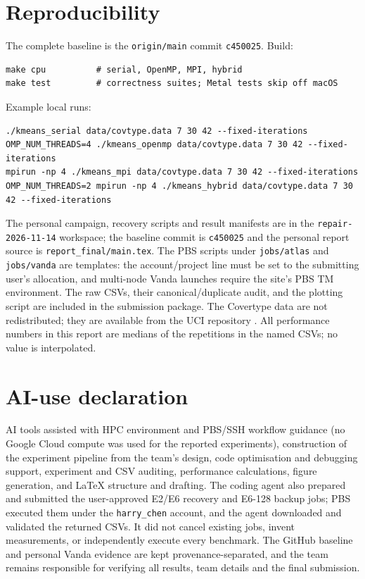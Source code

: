 \documentclass[10pt,a4paper]{article}
\newcommand{\code}[1]{\texttt{#1}}
\begin{document}
\section{Reproducibility}
The complete baseline is the \code{origin/main} commit \code{c450025}. Build:
\begin{verbatim}
make cpu          # serial, OpenMP, MPI, hybrid
make test         # correctness suites; Metal tests skip off macOS
\end{verbatim}
Example local runs:
\begin{verbatim}
./kmeans_serial data/covtype.data 7 30 42 --fixed-iterations
OMP_NUM_THREADS=4 ./kmeans_openmp data/covtype.data 7 30 42 --fixed-iterations
mpirun -np 4 ./kmeans_mpi data/covtype.data 7 30 42 --fixed-iterations
OMP_NUM_THREADS=2 mpirun -np 4 ./kmeans_hybrid data/covtype.data 7 30 42 --fixed-iterations
\end{verbatim}
The personal campaign, recovery scripts and result manifests are in the
\code{repair-2026-11-14} workspace; the baseline commit is \code{c450025} and
the personal report source is \code{report\_final/main.tex}. The PBS scripts
under \code{jobs/atlas} and \code{jobs/vanda} are templates:
the account/project line must be set to the submitting user's allocation, and
multi-node Vanda launches require the site's PBS TM environment. The raw CSVs,
their canonical/duplicate audit, and the plotting script are included in the
submission package. The Covertype data are not redistributed; they are
available from the UCI repository \citep{blackard1999}. All performance
numbers in this report are medians of the repetitions in the named CSVs; no
value is interpolated.

\section{AI-use declaration}
AI tools assisted with HPC environment and PBS/SSH workflow guidance (no Google Cloud compute was used for the reported experiments), construction of the experiment pipeline from the team's design, code optimisation and debugging support, experiment and CSV auditing, performance calculations, figure generation, and LaTeX structure and drafting. The coding agent also prepared and submitted the user-approved E2/E6 recovery and E6-128 backup jobs; PBS executed them under the \code{harry\_chen} account, and the agent downloaded and validated the returned CSVs. It did not cancel existing jobs, invent measurements, or independently execute every benchmark. The GitHub baseline and personal Vanda evidence are kept provenance-separated, and the team remains responsible for verifying all results, team details and the final submission.



\end{document}
